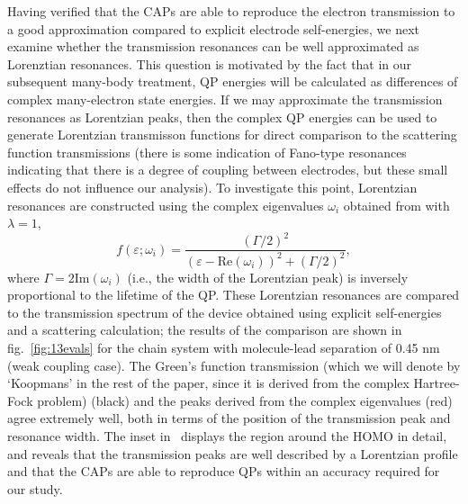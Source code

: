 Having verified that the \acp{CAP} are able to reproduce the electron
transmission to a good approximation compared to explicit
electrode self-energies, we next examine whether the transmission resonances
can be well approximated as Lorenztian resonances. This question is
motivated by the fact that in our subsequent many-body treatment,
\ac{QP} energies will be calculated as differences of complex
many-electron state energies. If we may approximate the transmission
resonances as Lorentzian peaks, then the complex \ac{QP} energies 
can be used to generate Lorentzian transmisson functions for direct
comparison to the scattering function transmissions (there is some
indication of Fano-type resonances indicating that there is a degree of
coupling between electrodes, but these small effects do not influence
our analysis). To investigate this point, Lorentzian  resonances are
constructed using the complex eigenvalues $\omega_i$ obtained from
 with $\lambda=1$, 
\begin{equation}
        f(\varepsilon;\omega_i)
        = \frac{\left( \Gamma/2 \right)^2}
               {(\varepsilon - \mathrm{Re}(\omega_i))^2
               + \left( \Gamma/2 \right)^2},
        \label{eq:lobro}
\end{equation}
where $\Gamma = 2 \mathrm{Im}(\omega_i)$ (i.e., the width of the
Lorentzian peak) is inversely proportional to the lifetime of the
\ac{QP}. These Lorentzian resonances are compared to the transmission
spectrum of the device obtained using explicit self-energies and a
scattering calculation; the results of the comparison are shown in
fig.~\ref{fig:13evals} for the chain system with molecule-lead separation
of 0.45 nm (weak coupling case). The Green's function transmission (which
we will denote by `Koopmans' in the rest of the paper, since it is derived
from the complex Hartree-Fock problem) (black) and the peaks derived
from the complex eigenvalues (red) agree extremely well, both in terms
of the position of the transmission peak and resonance width. The inset
in~ displays the region around the \ac{HOMO} in
detail, and reveals that the transmission peaks are well described by a
Lorentzian profile and that the CAPs are able to reproduce \acp{QP}
within an accuracy required for our study.

